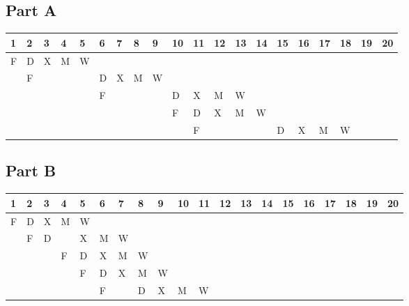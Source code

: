 \documentclass[letter]{article}
\theoremstyle{case}
\begin{document}
\subsection*{Part A}
\begin{table}[!h]
\centering
\begin{tabular}{l|l|l|l|l|l|l|l|l|l|l|l|l|l|l|l|l|l|l|l}
1                       & 2 & 3 & 4 & 5 & 6 & 7 & 8 & 9 & 10 & 11 & 12 & 13 & 14 & 15 & 16 & 17 & 18 & 19 & 20                    \\ \hline
\multicolumn{1}{|l|}{F} & D & X & M & W &   &   &   &   &    &    &    &    &    &    &    &    &    &    & \multicolumn{1}{l|}{} \\ \hline
\multicolumn{1}{|l|}{}  & F &   &   &   & D & X & M & W &    &    &    &    &    &    &    &    &    &    & \multicolumn{1}{l|}{} \\ \hline
\multicolumn{1}{|l|}{}  &   &   &   &   & F &   &   &   & D  & X  & M  & W  &    &    &    &    &    &    & \multicolumn{1}{l|}{} \\ \hline
\multicolumn{1}{|l|}{}  &   &   &   &   &   &   &   &   & F  & D  & X  & M  & W  &    &    &    &    &    & \multicolumn{1}{l|}{} \\ \hline
\multicolumn{1}{|l|}{}  &   &   &   &   &   &   &   &   &    & F  &    &    &    & D  & X  & M  & W  &    & \multicolumn{1}{l|}{} \\ \hline
\end{tabular}
\end{table}

\subsection*{Part B}
\begin{table}[!h]
\centering
\begin{tabular}{l|l|l|l|l|l|l|l|l|l|l|l|l|l|l|l|l|l|l|l}
1                       & 2 & 3 & 4 & 5 & 6 & 7 & 8 & 9 & 10 & 11 & 12 & 13 & 14 & 15 & 16 & 17 & 18 & 19 & 20                    \\ \hline
\multicolumn{1}{|l|}{F} & D & X & M & W &   &   &   &   &    &    &    &    &    &    &    &    &    &    & \multicolumn{1}{l|}{} \\ \hline
\multicolumn{1}{|l|}{}  & F & D &   & X & M & W &   &   &    &    &    &    &    &    &    &    &    &    & \multicolumn{1}{l|}{} \\ \hline
\multicolumn{1}{|l|}{}  &   &   & F & D & X & M & W &   &    &    &    &    &    &    &    &    &    &    & \multicolumn{1}{l|}{} \\ \hline
\multicolumn{1}{|l|}{}  &   &   &   & F & D & X & M & W &    &    &    &    &    &    &    &    &    &    & \multicolumn{1}{l|}{} \\ \hline
\multicolumn{1}{|l|}{}  &   &   &   &   & F &   & D & X & M  & W  &    &    &    &    &    &    &    &    & \multicolumn{1}{l|}{} \\ \hline
\end{tabular}
\end{table}
\newpage
\end{document}
